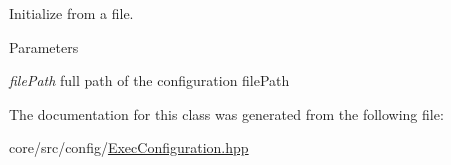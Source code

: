 Initialize from a file. 


\begin{DoxyParams}{Parameters}
\item[{\em filePath}]full path of the configuration filePath \end{DoxyParams}


The documentation for this class was generated from the following file:\begin{DoxyCompactItemize}
\item 
core/src/config/\hyperlink{ExecConfiguration_8hpp}{ExecConfiguration.hpp}\end{DoxyCompactItemize}
